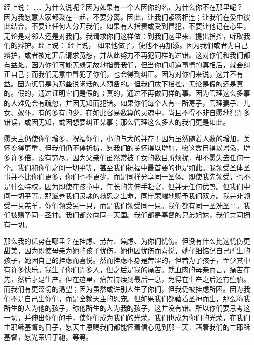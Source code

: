 经上说： ……  为什么说呢？因为如果有一个人因你的名，为什么你不在那里呢？因为我愿意大家都聚在一起，不要分离。因此，让我们紧密相连；让我们在爱中彼此结合，不要让任何人分开我们。如果有人指责或受到冒犯，不要让他记在心里，无论是对邻人还是对我们。我请求你们这样做：到我们这里来，提出指控，听取我们的辩护。经上说： 经上说，  如果他做了，使他不再加添。因为我们或者为自己辩护，或者被定罪后请求宽恕，并从此努力不再犯同样的过错。这对你们和我们都有益处。因为你们可能无缘无故地指责我们，但当你们知道事情的真相后，就会纠正自己；而我们无意中冒犯了你们，也会得到纠正。因为对你们来说，这并不有益。因为惩罚是为那些说闲话的人预备的。但我们放下指控，无论是假的还是真的。假的，通过证明它们是假的；真的，通过不再做同样的事。因为管理这么多事的人难免会有疏忽，并因无知而犯错。如果你们每个人有一所房子，管理妻子、儿女、奴仆，有的多有的少，在如此容易数算的灵魂中，尚且不得不非自愿地犯许多错误，或因无知，或因想要纠正某事；那么管理这么多人的我们更是如此。\par

愿天主仍使你们增多，祝福你们，小的与大的并存！因为虽然随着人数的增加，关怀变得更重，但我们仍不停祈祷，愿我们的关怀得以增加，愿这数目得以增添，增多许多倍，没有穷尽。因为父亲们虽然常被子女的数目所烦扰，却不愿失去任何一个。我们和你们之间一切平等，甚至我们祝福中最首要的也是如此。我领受圣体圣事并不比你们更多，你们也不更少，而是同样分享同一圣体。即使我先领受，也不是什么特权，因为即使在孩童中，年长的先伸手赴宴，但并无任何优势。但我们中间一切平等。那滋养我们灵魂的救恩之生命，同样荣耀地赐予我们双方。我并非领受一只羔羊，你们领受另一只，而是我们领受同一只。我们都有同一圣洗圣事。我们被赐予同一圣神。我们都奔向同一天国。我们都是基督的兄弟姐妹，我们共同拥有一切。\par

那么我的优势在哪里？在挂虑、劳苦、焦虑、为你们忧伤。但没有什么比这忧伤更甜美，因为即使母亲为她的孩子忧伤，她也因忧伤而喜悦，她仔细惦记自己所生的孩子，她因自己的挂虑而喜悦。然而挂虑本身是苦涩的，但若为了孩子，至少其中有许多快乐。我生了你们许多人，但之后是我的痛苦。就血肉的母亲而言，痛苦在先，然后才是生产。但在这里，痛苦持续到最后一息，免得在生产之后还有堕胎。而我们有更深切的渴望；因为虽然或许别人生了你们，但我仍被挂虑所困。因为我们不是自己生你们，而是全赖天主的恩宠。但如果我们都藉着圣神而生，那么称我所生的人为他的孩子，称他所生的人为我的孩子，这并没有错。所以你们要思考这一切，并伸出你们的手，使你们成为我们的光荣，我们也成为你们的光荣，在我们主耶稣基督的日子，愿天主恩赐我们都能怀着信心见到那一天，藉着我们的主耶稣基督，愿光荣归于祂，等等。\par

